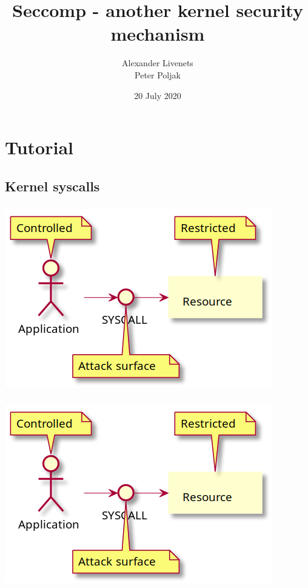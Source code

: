 \documentclass[usenames,dvipsnames]{beamer}
\title{Seccomp - another kernel security mechanism}
\subtitle{}
\author{Alexander Livenets \\ Peter Poljak}
\institute{}
\date{20 July 2020}
\begin{document}


\begin{frame}
\titlepage
\end{frame}

\section{Tutorial}
\subsection{Kernel syscalls}
\begin{frame}
\frametitle{\subsecname}
\centering
\includegraphics[scale=0.5]{images/surface-001.png}
\end{frame}

\begin{frame}
\frametitle{\subsecname}
\centering
\includegraphics[scale=0.5]{images/surface-001.png}
\end{frame}
\end{document}
